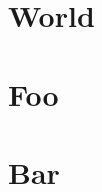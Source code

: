     \section{World}
        \lipsum[21]
        
    \section{Foo}
        

        
        
        \lipsum[21]
        
    \section{Bar}
        \lipsum[45]
        
